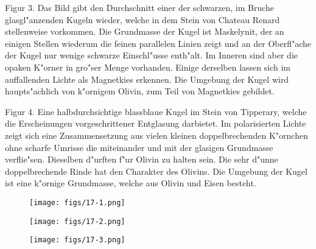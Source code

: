 \documentclass[a4paper, 11pt, oneside, polutonikogreek, german]{article}
\begin{document}
Figur 3. Das Bild gibt den Durchschnitt einer der schwarzen, im Bruche glasgl"anzenden Kugeln wieder, welche in dem Stein von Chateau Renard stellenweise vorkommen. Die Grundmasse der Kugel ist Maskelynit, der an einigen Stellen wiederum die feinen parallelen Linien zeigt und an der Oberfl"ache der Kugel nur wenige schwarze Einschl"usse enth"alt. Im Inneren sind aber die opaken K"orner in gro"ser Menge vorhanden. Einige derselben lassen sich im auffallenden Lichte als Magnetkies erkennen. Die Umgebung der Kugel wird haupts"achlich von k"ornigem Olivin, zum Teil von Magnetkies gebildet.

Figur 4. Eine halbdurchsichtige blassblaue Kugel im Stein von Tipperary, welche die Erscheinungen vorgeschrittener Entglasung darbietet. Im polarisierten Lichte zeigt sich eine Zusammensetzung aus vielen kleinen doppelbrechenden K"ornchen ohne scharfe Umrisse die miteinander und mit der glasigen Grundmasse verflie"sen. Dieselben d"urften f"ur Olivin zu halten sein. Die sehr d"unne doppelbrechende Rinde hat den Charakter des Olivins. Die Umgebung der Kugel ist eine k"ornige Grundmasse, welche aus Olivin und Eisen besteht.
\clearpage

\vspace*{\fill}
\begin{figure}[H]
\centering
\texttt{[image: figs/17-1.png]}
\caption{}
\end{figure}
\vspace*{\fill}
\clearpage

\vspace*{\fill}
\begin{figure}[H]
\centering
\texttt{[image: figs/17-2.png]}
\caption{}
\end{figure}
\vspace*{\fill}
\clearpage

\vspace*{\fill}
\begin{figure}[H]
\centering
\texttt{[image: figs/17-3.png]}
\caption{}
\end{figure}
\vspace*{\fill}
\clearpage
\end{document}
